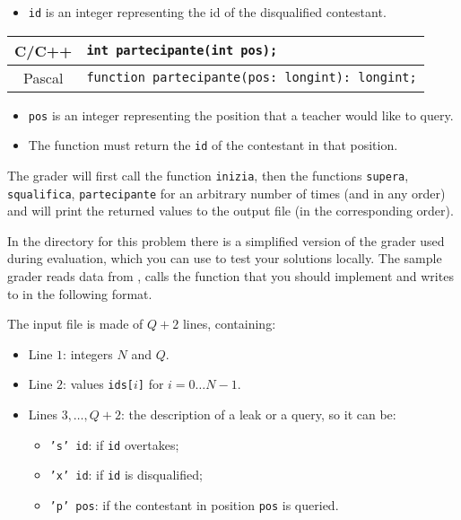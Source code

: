 \begin{itemize}[nolistsep]
  \item \texttt{id} is an integer representing the id of the disqualified contestant.
\end{itemize}

\pagebreak

\begin{center}\begin{tabularx}{\textwidth}{|c|X|}
\hline
C/C++  & \verb|int partecipante(int pos);|\\
\hline
Pascal  & \verb|function partecipante(pos: longint): longint;|\\
\hline
\end{tabularx}\end{center}

\begin{itemize}[nolistsep]
  \item \texttt{pos} is an integer representing the position that a teacher would like to query.
  \item The function must return the \texttt{id} of the contestant in that position.
\end{itemize}

\medskip

The grader will first call the function \texttt{inizia}, then the functions \texttt{supera}, \texttt{squalifica}, \texttt{partecipante} for an arbitrary number of times (and in any order) and will print the returned values to the output file (in the corresponding order).



\Grader
In the directory for this problem there is a simplified version of the grader used during evaluation, which you can use to test your solutions locally. The sample grader reads data from , calls the function that you should implement and writes to \outputfile{} in the following format.

The input file is made of $Q+2$ lines, containing:
\begin{itemize}[nolistsep,itemsep=2mm]
\item Line $1$: integers $N$ and $Q$.
\item Line $2$: values \texttt{ids[$i$]} for $i = 0\ldots N-1$.
\item Lines $3, \ldots, Q+2$: the description of a leak or a query, so it can be:
	\begin{itemize}
	\item \texttt{'s' id}: if \texttt{id} overtakes;
	\item \texttt{'x' id}: if \texttt{id} is disqualified;
	\item \texttt{'p' pos}: if the contestant in position \texttt{pos} is queried.
	\end{itemize}
\end{itemize}

